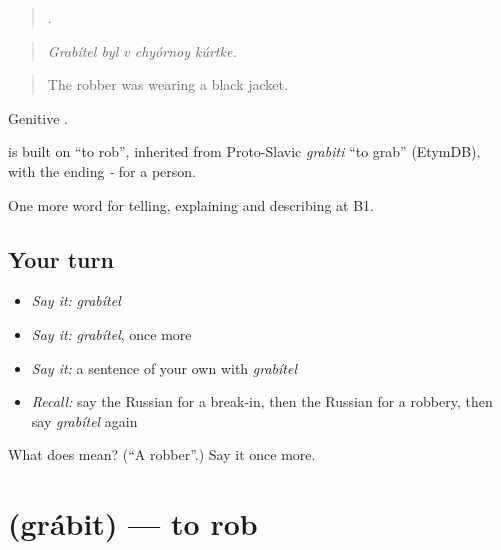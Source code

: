 \begin{quote}
    .
\end{quote}

\begin{quote}
\emph{Grabítel byl v chyórnoy kúrtke.}
\end{quote}

\begin{quote}
The robber was wearing a black jacket.
\end{quote}

Genitive \emph{}.

\begin{cousinweb}
\emph{} is built on \emph{} \textquotedblleft{}to rob\textquotedblright{}, inherited from Proto-Slavic \emph{grabiti} \textquotedblleft{}to grab\textquotedblright{} (EtymDB), with the ending \emph{-} for a person.
\end{cousinweb}

\begin{grammarlens}[title={What you've built}]
One more word for telling, explaining and describing at B1.
\end{grammarlens}

\subsection*{Your turn}
\begin{itemize}
\raggedright
  \item \emph{Say it:} \emph{grabítel}
  \item \emph{Say it:} \emph{grabítel}, once more
  \item \emph{Say it:} a sentence of your own with \emph{grabítel}
  \item \emph{Recall:} say the Russian for a break-in, then the Russian for a robbery, then say \emph{grabítel} again
\end{itemize}

\begin{tcolorbox}[breakable,colback=teal!4,colframe=teal!35!black,title={Before you move on}]
What does  mean? (\textquotedblleft{}A robber\textquotedblright{}.) Say it once more.
\end{tcolorbox}
\section[\texorpdfstring{\ru{грабить} (grábit)}{грабить (grábit)}]{ (grábit) — to rob}

